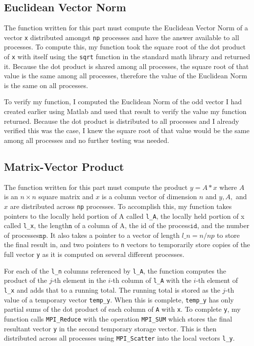 \documentclass[11pt]{article}
\begin{document}
\subsection{Euclidean Vector Norm}
The function written for this part must compute the Euclidean Vector Norm of a vector \texttt{x} distributed amongst \texttt{np} processes and have the answer available to all processes. To compute this, my function took the square root of the dot product of \texttt{x} with itself using the \texttt{sqrt} function in the standard math library and returned it. Because the dot product is shared among all processes, the square root of that value is the same among all processes, therefore the value of the Euclidean Norm is the same on all processes.

To verify my function, I computed the Euclidean Norm of the odd vector I had created earlier using Matlab and used that result to verify the value my function returned. Because the dot product is distributed to all processes and I already verified this was the case, I knew the square root of that value would be the same among all processes and no further testing was needed.

\subsection{Matrix-Vector Product}
The function written for this part must compute the product $y=A*x$ where $A$ is an $n \times n$ square matrix and $x$ is a column vector of dimension $n$ and $y, A,$ and $x$ are distributed across \texttt{np} processes. To accomplish this, my function takes pointers to the locally held portion of A called \texttt{l\_A}, the locally held portion of x called \texttt{l\_x}, the length\(\texttt{n}\) of a column of A, the id of the process\(\texttt{id}\), and the number of processes\(\texttt{np}\). It also takes a pointer to a vector of length $ l\_n = n / np $ to store the final result in, and two pointers to \texttt{n} vectors to temporarily store copies of the full vector \texttt{y} as it is computed on several different processes.

For each of the \texttt{l\_n} columns referenced by \texttt{l\_A}, the function computes the product of the $j$-th element in the $i$-th column of \texttt{l\_A} with the $i$-th element of \texttt{l\_x} and adds that to a running total. The running total is stored as the $j$-th value of a temporary vector \texttt{temp\_y}. When this is complete, \texttt{temp\_y} has only partial sums of the dot product of each column of \texttt{A} with \texttt{x}. To complete \texttt{y}, my function calls \texttt{MPI\_Reduce} with the operation \texttt{MPI\_SUM} which stores the final resultant vector \texttt{y} in the second temporary storage vector. This is then distributed across all processes using \texttt{MPI\_Scatter} into the local vectors \texttt{l\_y}.
\end{document}
